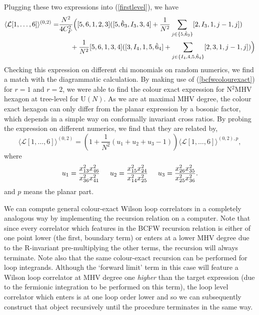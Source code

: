 \documentclass[12pt]{article}
\numberwithin{equation}{section}
\begin{document}
Plugging these two expressions into (\ref{firstlevel}), we have
\begin{align}
    \langle \mathcal{L}[1,\hdots,6]\rangle^{(0,2)}= & \frac{N^2}{4C_F^2}\Bigl([5,6,1,2,3]([5,\hat{6}_3,I_3,3,4]+\frac{1}{N^2}\sum_{j\in \{5,\hat{6}_3\}}[2,I_3,1,j-1,j])\notag\\
    &\hspace{6mm}+\frac{1}{N^2}[5,6,1,3,4]([3,I_4,1,5,\hat{6}_4]+\sum_{j\in\{I_4,4,5,\hat{6}_4\}}[2,3,1,j-1,j])\Bigr)
\end{align}
Checking this expression on different chi monomials on random numerics, we find a match with the diagrammatic calculation. By making use of (\ref{bcfwcolourexact}) for $r=1$ and $r=2$, we were able to find the colour exact expression for N$^2$MHV hexagon at tree-level for U$(N)$. As we are at maximal MHV degree, the colour exact hexagon can only differ from the planar expression by a bosonic factor, which depends in a simple way on conformally invariant cross ratios. By probing the expression on different numerics, we find that they are related by,
\begin{equation}
    \langle \mathcal{L}[1,\hdots,6] \rangle^{(0,2)} = \left(1+\frac{1}{N^2}(u_1+u_2+u_3-1)\right)\langle \mathcal{L}[1,\hdots,6]\rangle^{(0,2),p},
\end{equation}
where
\begin{equation}
    u_1=\frac{x_{13}^2x_{46}^2}{x_{36}^2x_{41}^2}\hspace{5mm}u_2=\frac{x_{15}^2x_{24}^2}{x_{14}^2x_{25}^2}\hspace{5mm} u_3=\frac{x_{26}^2 x_{35}^2}{x_{25}^2x_{36}^2}.
\end{equation}
and $p$ means the planar part.

We can compute general colour-exact Wilson loop correlators in a completely analogous way by implementing the recursion relation on a computer. Note that since every correlator which features in the BCFW recursion relation is either of one point lower (the first, boundary term) or enters at a lower MHV degree due to the R-invariant pre-multiplying the other terms, the recursion will always terminate. Note also that the same colour-exact recursion can be performed for loop integrands. Although the `forward limit' term in this case will feature a Wilson loop correlator at MHV degree one \emph{higher} than the target expression (due to the fermionic integration to be performed on this term), the loop level correlator which enters is at one loop order lower and so we can subsequently construct that object recursively until the procedure terminates in the same way. 
\end{document}
